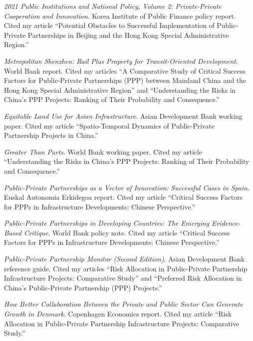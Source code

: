 \documentclass[11pt,a4paper]{report} %
\begin{document}
\begin{tablist}
        \item[2021] \tab{}\textit{2021 Public Institutions and National Policy, Volume 2: Private-Private Cooperation and Innovation}. Korea Institute of Public Finance policy report. Cited my article “Potential Obstacles to Successful Implementation of Public-Private Partnerships in Beijing and the Hong Kong Special Administrative Region.”  
    
        \item[2020] \tab{}\textit{Metropolitan Shenzhen: Rail Plus Property for Transit-Oriented Development}. World Bank report. Cited my articles “A Comparative Study of Critical Success Factors for Public-Private Partnerships (PPP) between Mainland China and the Hong Kong Special Administrative Region” and “Understanding the Risks in China's PPP Projects: Ranking of Their Probability and Consequence.”  
    
        \item[2020] \tab{}\textit{Equitable Land Use for Asian Infrastructure}. Asian Development Bank working paper. Cited my article “Spatio-Temporal Dynamics of Public-Private Partnership Projects in China.”  

        \item[2020] \tab{}\textit{Greater Than Parts}. World Bank working paper. Cited my article “Understanding the Risks in China's PPP Projects: Ranking of Their Probability and Consequence.”  
    
        \item[2019] \tab{}\textit{Public-Private Partnerships as a Vector of Innovation: Successful Cases in Spain}. Euskal Autonomia Erkidegoa report. Cited my article “Critical Success Factors for PPPs in Infrastructure Developments: Chinese Perspective.”  

        \item[2019] \tab{}\textit{Public-Private Partnerships in Developing Countries: The Emerging Evidence-Based Critique}. World Bank policy note. Cited my article “Critical Success Factors for PPPs in Infrastructure Developments: Chinese Perspective.”  
    
        \item[2019] \tab{}\textit{Public-Private Partnership Monitor (Second Edition)}. Asian Development Bank reference guide. Cited my articles “Risk Allocation in Public-Private Partnership Infrastructure Projects: Comparative Study” and “Preferred Risk Allocation in China's Public-Private Partnership (PPP) Projects.”  
    
        \item[2019] \tab{}\textit{How Better Collaboration Between the Private and Public Sector Can Generate Growth in Denmark}. Copenhagen Economics report. Cited my article “Risk Allocation in Public-Private Partnership Infrastructure Projects: Comparative Study.”  
    

\end{tablist}
\end{document}
